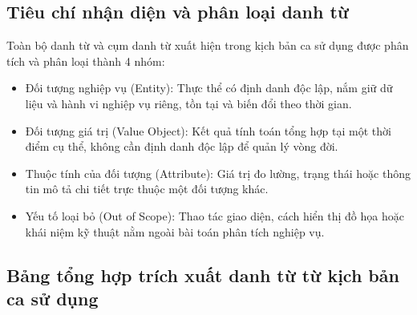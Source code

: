 \documentclass[11pt,a4paper]{article}
\begin{document}
\subsection{Tiêu chí nhận diện và phân loại danh từ}
Toàn bộ danh từ và cụm danh từ xuất hiện trong kịch bản ca sử dụng được phân tích và phân loại thành 4 nhóm:
\begin{itemize}
  \item Đối tượng nghiệp vụ (Entity): Thực thể có định danh độc lập, nắm giữ dữ liệu và hành vi nghiệp vụ riêng, tồn tại và biến đổi theo thời gian.
  \item Đối tượng giá trị (Value Object): Kết quả tính toán tổng hợp tại một thời điểm cụ thể, không cần định danh độc lập để quản lý vòng đời.
  \item Thuộc tính của đối tượng (Attribute): Giá trị đo lường, trạng thái hoặc thông tin mô tả chi tiết trực thuộc một đối tượng khác.
  \item Yếu tố loại bỏ (Out of Scope): Thao tác giao diện, cách hiển thị đồ họa hoặc khái niệm kỹ thuật nằm ngoài bài toán phân tích nghiệp vụ.
\end{itemize}

\subsection{Bảng tổng hợp trích xuất danh từ từ kịch bản ca sử dụng}
\end{document}
